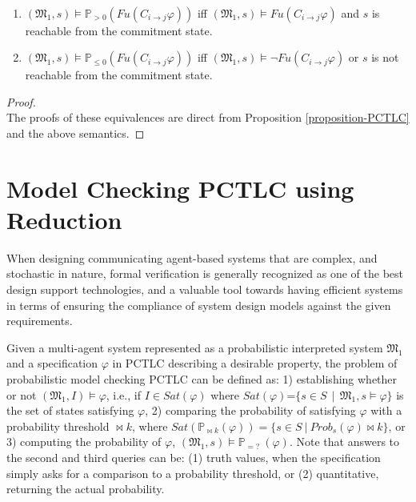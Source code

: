 \begin{theorem}\label{Fulfiilemt Equivelances} ~\\

\begin{enumerate}
\item $(\mathfrak{M_1},s)\models \mathbb{P}_{>0} (Fu(C_{i \rightarrow
j}\varphi))$ iff $(\mathfrak{M_1},s)\models Fu(C_{i \rightarrow
j}\varphi)$ and $s$ is reachable from the commitment state.

\item $(\mathfrak{M_1},s)\models \mathbb{P}_{\leq0} (Fu(C_{i \rightarrow
j}\varphi))$ iff $(\mathfrak{M_1},s)\models \neg Fu(C_{i \rightarrow
j}\varphi)$ or $s$ is not reachable from the commitment state.

\end{enumerate}

\end{theorem}

\begin{proof} \hspace{0.5cm} \\
The proofs of these equivalences are direct from Proposition
\ref{proposition-PCTLC} and the above semantics.

 \end{proof}


\section{Model Checking PCTLC using Reduction}\label{sec:model-checking-pctlc}
When designing communicating agent-based systems that are complex,
and stochastic in nature, formal verification is generally
recognized as one of the best design support technologies, and a
valuable tool towards having efficient systems in terms of
ensuring the compliance of system design models against the given
requirements.

Given a multi-agent system represented as a probabilistic interpreted system $\mathfrak{M_1}$ and a specification $\varphi$ in PCTLC describing a desirable property, the problem of probabilistic model checking PCTLC can be defined as: 1) establishing whether or not $(\mathfrak{M_1},
I)\models \varphi$, i.e., if $I \in Sat(\varphi)$ where
$Sat(\varphi)$=$\{s\in S ~~|~~ \mathfrak{M_1},s \models \varphi \}$
is the set of states satisfying $\varphi$, 2) comparing the
probability of satisfying $\varphi$ with a probability threshold
$\bowtie k$, where $Sat(\mathbb{P}_{\bowtie k}(\varphi))=\{s\in S
~|~ Prob_s(\varphi)\bowtie k \}$, or 3) computing the probability
of $\varphi$, $(\mathfrak{M_1}, s)\models \mathbb{P}_{=?}
~(\varphi)$. Note that answers to the second and third queries can
be: (1) truth values, when the specification simply asks for a
comparison to a probability threshold, or (2) quantitative,
returning the actual probability.


